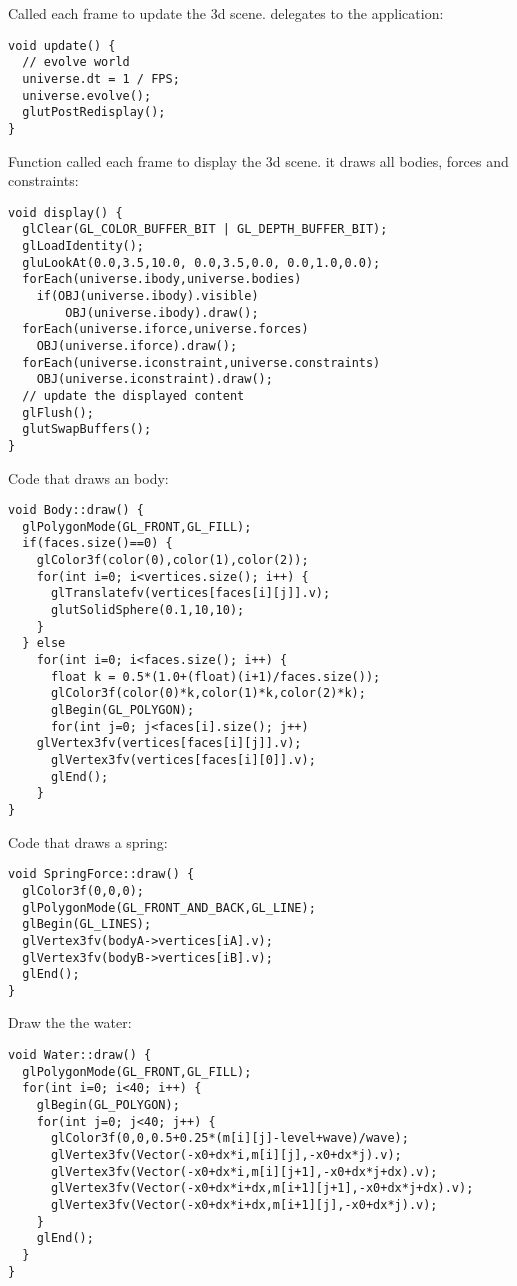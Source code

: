 \noindent
Called each frame to update the 3d scene. delegates to
the application: \begin{lstlisting}
void update() {
  // evolve world
  universe.dt = 1 / FPS;
  universe.evolve();
  glutPostRedisplay();
}
\end{lstlisting}
\noindent
Function called each frame to display the 3d scene.
it draws all bodies, forces and constraints: \begin{lstlisting}
void display() {
  glClear(GL_COLOR_BUFFER_BIT | GL_DEPTH_BUFFER_BIT);
  glLoadIdentity();
  gluLookAt(0.0,3.5,10.0, 0.0,3.5,0.0, 0.0,1.0,0.0);
  forEach(universe.ibody,universe.bodies)
    if(OBJ(universe.ibody).visible)
		OBJ(universe.ibody).draw();
  forEach(universe.iforce,universe.forces)
    OBJ(universe.iforce).draw();
  forEach(universe.iconstraint,universe.constraints)
    OBJ(universe.iconstraint).draw();
  // update the displayed content
  glFlush();
  glutSwapBuffers();
}
\end{lstlisting}
\noindent
Code that draws an body: \begin{lstlisting}
void Body::draw() {
  glPolygonMode(GL_FRONT,GL_FILL);
  if(faces.size()==0) {
    glColor3f(color(0),color(1),color(2));
    for(int i=0; i<vertices.size(); i++) {
      glTranslatefv(vertices[faces[i][j]].v);
      glutSolidSphere(0.1,10,10);
    }
  } else
    for(int i=0; i<faces.size(); i++) {
      float k = 0.5*(1.0+(float)(i+1)/faces.size());
      glColor3f(color(0)*k,color(1)*k,color(2)*k);    
      glBegin(GL_POLYGON);        
      for(int j=0; j<faces[i].size(); j++)
	glVertex3fv(vertices[faces[i][j]].v);
      glVertex3fv(vertices[faces[i][0]].v);
      glEnd();
    }
}
\end{lstlisting}
\noindent
Code that draws a spring: \begin{lstlisting}
void SpringForce::draw() {
  glColor3f(0,0,0);
  glPolygonMode(GL_FRONT_AND_BACK,GL_LINE);
  glBegin(GL_LINES);
  glVertex3fv(bodyA->vertices[iA].v);
  glVertex3fv(bodyB->vertices[iB].v);
  glEnd();
}
\end{lstlisting}
\noindent
Draw the the water: \begin{lstlisting}
void Water::draw() {
  glPolygonMode(GL_FRONT,GL_FILL);
  for(int i=0; i<40; i++) {
    glBegin(GL_POLYGON);
    for(int j=0; j<40; j++) {
      glColor3f(0,0,0.5+0.25*(m[i][j]-level+wave)/wave);
      glVertex3fv(Vector(-x0+dx*i,m[i][j],-x0+dx*j).v);
      glVertex3fv(Vector(-x0+dx*i,m[i][j+1],-x0+dx*j+dx).v);
      glVertex3fv(Vector(-x0+dx*i+dx,m[i+1][j+1],-x0+dx*j+dx).v);
      glVertex3fv(Vector(-x0+dx*i+dx,m[i+1][j],-x0+dx*j).v);
    }
    glEnd();
  }      
}
\end{lstlisting}
